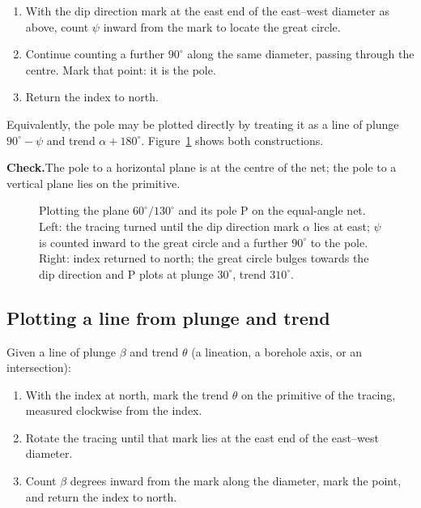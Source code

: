 \begin{enumerate}
  \item With the dip direction mark at the east end of the east--west
        diameter as above, count $\psi$ inward from the mark to locate
        the great circle.
  \item Continue counting a further $90^\circ$ along the same diameter,
        passing through the centre. Mark that point: it is the pole.
  \item Return the index to north.
\end{enumerate}

Equivalently, the pole may be plotted directly by treating it as a line of
plunge $90^\circ - \psi$ and trend $\alpha + 180^\circ$.
Figure~\ref{fig:construct-plane-pole} shows both constructions.

\noindent\textbf{Check.}\enspace The pole to a horizontal plane is at the
centre of the net; the pole to a vertical plane lies on the primitive.

\begin{figure}[htbp]
\centering
{}
\caption{Plotting the plane $60^\circ/130^\circ$ and its pole P on the equal-angle net. Left: the tracing turned until the dip direction mark $\alpha$ lies at east; $\psi$ is counted inward to the great circle and a further $90^\circ$ to the pole. Right: index returned to north; the great circle bulges towards the dip direction and P plots at plunge $30^\circ$, trend $310^\circ$.}
\label{fig:construct-plane-pole}
\end{figure}

\subsection{Plotting a line from plunge and trend}
\label{sec:construct-line}

Given a line of plunge $\beta$ and trend $\theta$ (a lineation, a borehole
axis, or an intersection):

\begin{enumerate}
  \item With the index at north, mark the trend $\theta$ on the primitive
        of the tracing, measured clockwise from the index.
  \item Rotate the tracing until that mark lies at the east end of the
        east--west diameter.
  \item Count $\beta$ degrees inward from the mark along the diameter,
        mark the point, and return the index to north.
\end{enumerate}

